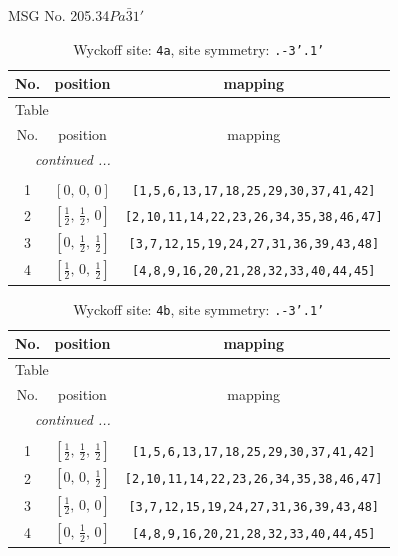 \documentclass[fleqn,8pt]{jsarticle}
\begin{document}
\setcounter{MaxMatrixCols}{32}

\renewcommand{\tablename}{Table~}
\renewcommand{\figurename}{Figure~}
\begin{center}
\LARGE
MSG No. 205.34\quad$Pa\bar{3}1'$
\end{center}
\renewcommand{\arraystretch}{1.2}
\begin{longtable}{ccc}
\caption{Wyckoff site: {\tt 4a}, site symmetry: {\tt .-3'.1'}}
 \\
 \hline \hline
No. & position & mapping \\ \hline \endfirsthead

\multicolumn{2}{l}{\tablename\ \thetable{}} \\
 \hline \hline
No. & position & mapping \\ \hline \endhead

 \hline \hline
\multicolumn{2}{r}{\footnotesize\it continued ...} \\ \endfoot

 \hline \hline
\multicolumn{2}{r}{} \\ \endlastfoot

1 & $\left[ 0,\, 0,\, 0 \right]$ & {\tt [1,5,6,13,17,18,25,29,30,37,41,42]} \\ \hline
2 & $\left[ \frac{1}{2},\, \frac{1}{2},\, 0 \right]$ & {\tt [2,10,11,14,22,23,26,34,35,38,46,47]} \\ \hline
3 & $\left[ 0,\, \frac{1}{2},\, \frac{1}{2} \right]$ & {\tt [3,7,12,15,19,24,27,31,36,39,43,48]} \\ \hline
4 & $\left[ \frac{1}{2},\, 0,\, \frac{1}{2} \right]$ & {\tt [4,8,9,16,20,21,28,32,33,40,44,45]} \\
\end{longtable}
\renewcommand{\arraystretch}{1.2}
\begin{longtable}{ccc}
\caption{Wyckoff site: {\tt 4b}, site symmetry: {\tt .-3'.1'}}
 \\
 \hline \hline
No. & position & mapping \\ \hline \endfirsthead

\multicolumn{2}{l}{\tablename\ \thetable{}} \\
 \hline \hline
No. & position & mapping \\ \hline \endhead

 \hline \hline
\multicolumn{2}{r}{\footnotesize\it continued ...} \\ \endfoot

 \hline \hline
\multicolumn{2}{r}{} \\ \endlastfoot

1 & $\left[ \frac{1}{2},\, \frac{1}{2},\, \frac{1}{2} \right]$ & {\tt [1,5,6,13,17,18,25,29,30,37,41,42]} \\ \hline
2 & $\left[ 0,\, 0,\, \frac{1}{2} \right]$ & {\tt [2,10,11,14,22,23,26,34,35,38,46,47]} \\ \hline
3 & $\left[ \frac{1}{2},\, 0,\, 0 \right]$ & {\tt [3,7,12,15,19,24,27,31,36,39,43,48]} \\ \hline
4 & $\left[ 0,\, \frac{1}{2},\, 0 \right]$ & {\tt [4,8,9,16,20,21,28,32,33,40,44,45]} \\
\end{longtable}
\end{document}
